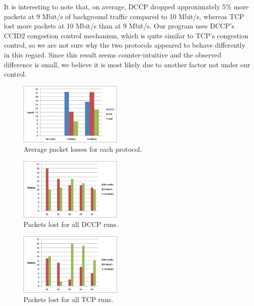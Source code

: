 It is interesting to note that, on average, DCCP dropped approximately 5\% more
packets at 9 Mbit/s of background traffic compared to 10 Mbit/s, whereas TCP
lost more packets at 10 Mbit/s than at 9 Mbit/s. Our program uses DCCP's
CCID2 congestion control mechanism, which is quite similar to TCP's congestion
control, so we are not sure why the two protocols appeared to behave differently
in this regard. Since this result seems counter-intuitive and the observed
difference is small, we believe it is most likely due to another factor not
under our control.

\begin{figure}[!h]
   \centering
      \includegraphics[width=0.45\textwidth]{pics/avg_losses}
   \caption{Average packet losses for each protocol.}
\label{fig:avg_losses}
\end{figure}

\begin{figure}[!h]
   \centering
      \includegraphics[width=0.45\textwidth]{pics/dccp_losses}
   \caption{Packets lost for all DCCP runs.}
\label{fig:dccp_losses}
\end{figure}

\begin{figure}[!h]
   \centering
      \includegraphics[width=0.45\textwidth]{pics/tcp_losses}
   \caption{Packets lost for all TCP runs.}
\label{fig:tcp_losses}
\end{figure}

